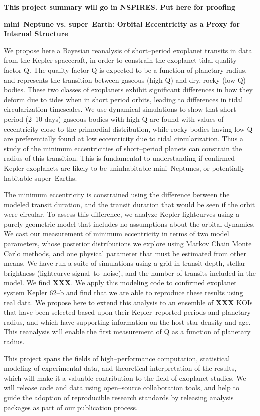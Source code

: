 \centerline{\bf This project summary will go in NSPIRES.  Put here for proofing} \medskip

\centerline{\bf mini--Neptune vs. super--Earth: Orbital Eccentricity as a Proxy for Internal Structure} \medskip

We propose here a Bayesian reanalysis of short--period exoplanet
transits in data from the Kepler spacecraft, in order to constrain the
exoplanet tidal quality factor Q.  The quality factor Q is expected to
be a function of planetary radius, and represents the transition
between gaseous (high Q) and dry, rocky (low Q) bodies.  These two
classes of exoplanets exhibit significant differences in how they
deform due to tides when in short period orbits, leading to
differences in tidal circularization timescales.  We use dynamical
simulations to show that short period (2--10 days) gaseous bodies with
high Q are found with values of eccentricity close to the primordial
distribution, while rocky bodies having low Q are preferentially found
at low eccentricity due to tidal circularization.  Thus a study of the
minimum eccentricities of short--period planets can constrain the
radius of this transition.  This is fundamental to understanding if
confirmed Kepler exoplanets are likely to be uninhabitable
mini--Neptunes, or potentially habitable super--Earths.

The minimum eccentricity is constrained using the difference between
the modeled transit duration, and the transit duration that would be
seen if the orbit were circular.  To assess this difference, we
analyze Kepler lightcurves using a purely geometric model that
includes no assumptions about the orbital dynamics.  We cast our
measurement of minimum eccentricity in terms of two model parameters,
whose posterior distributions we explore using Markov Chain Monte
Carlo methods, and one physical parameter that must be estimated from
other means.  We have run a suite of simulations using a grid in
transit depth, stellar brightness (lightcurve signal--to--noise), and
the number of transits included in the model.  We find {\bf XXX}.  We
apply this modeling code to confirmed exoplanet system Kepler 62--b
and find that we are able to reproduce these results using real data.
We propose here to extend this analysis to an ensemble of {\bf XXX}
KOIs that have been selected based upon their Kepler--reported periods
and planetary radius, and which have supporting information on the
host star density and age.  This reanalysis will enable the first
measurement of Q as a function of planetary radius.

This project spans the fields of high--performance computation,
statistical modeling of experimental data, and theoretical
interpretation of the results, which will make it a valuable
contribution to the field of exoplanet studies.  We will release code
and data using open--source collaboration tools, and help to guide the
adoption of reproducible research standards by releasing analysis
packages as part of our publication process.

